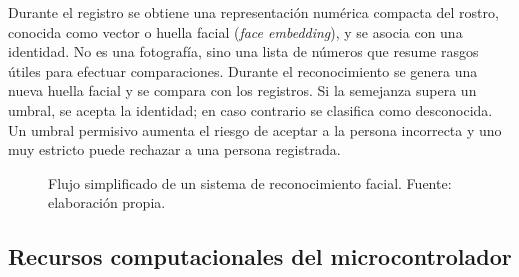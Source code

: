Durante el registro se obtiene una representación numérica compacta del rostro,
conocida como vector o huella facial (\textit{face embedding}), y se asocia con
una identidad. No es una fotografía, sino una lista de números que resume rasgos
útiles para efectuar comparaciones. Durante el reconocimiento se genera una
nueva huella facial y se compara con los registros. Si la semejanza supera un
umbral, se acepta la identidad; en caso contrario se clasifica como desconocida.
Un umbral permisivo aumenta el riesgo de aceptar a la persona incorrecta y uno
muy estricto puede rechazar a una persona registrada.

\begin{figure}[H]
    \centering
    \caption{Flujo simplificado de un sistema de reconocimiento facial. Fuente: elaboración propia.}
    \label{fig:flujo_reconocimiento_facial}
\end{figure}

\subsection{Recursos computacionales del microcontrolador}

